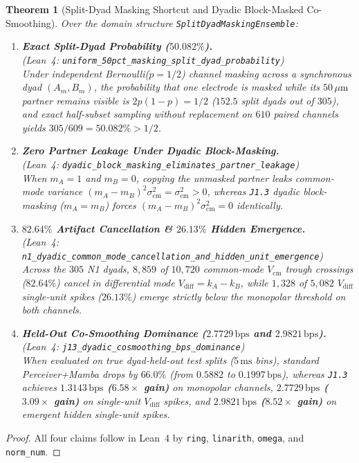 \documentclass[11pt,letterpaper]{article}
\newcommand{\lean}[1]{\nolinkurl{#1}}
\newtheorem{theorem}{Theorem}[section]
\theoremstyle{definition}
\begin{document}
\begin{theorem}[Split-Dyad Masking Shortcut and Dyadic Block-Masked Co-Smoothing]\label{thm:pillar9}
Over the domain structure \lean{SplitDyadMaskingEnsemble}:
\begin{enumerate}
  \item \textbf{Exact Split-Dyad Probability ($50.082\%$).}\\
  (\emph{Lean~4:} \lean{uniform_50pct_masking_split_dyad_probability})\\
  Under independent Bernoulli($p = 1/2$) channel masking across a synchronous dyad $(A_m, B_m)$, the probability that one electrode is masked while its $50\,\mu\text{m}$ partner remains visible is $2p(1-p) = 1/2$ ($152.5$ split dyads out of $305$), and exact half-subset sampling without replacement on $610$ paired channels yields $305 / 609 = 50.082\% > 1/2$.
  \item \textbf{Zero Partner Leakage Under Dyadic Block-Masking.}\\
  (\emph{Lean~4:} \lean{dyadic_block_masking_eliminates_partner_leakage})\\
  When $m_A = 1$ and $m_B = 0$, copying the unmasked partner leaks common-mode variance $(m_A - m_B)^2 \sigma_{\mathrm{cm}}^2 = \sigma_{\mathrm{cm}}^2 > 0$, whereas \texttt{J1.3} dyadic block-masking ($m_A = m_B$) forces $(m_A - m_B)^2 \sigma_{\mathrm{cm}}^2 = 0$ identically.
  \item \textbf{$82.64\%$ Artifact Cancellation \& $26.13\%$ Hidden Emergence.}\\
  (\emph{Lean~4:} \lean{n1_dyadic_common_mode_cancellation_and_hidden_unit_emergence})\\
  Across the $305$ N1 dyads, $8{,}859$ of $10{,}720$ common-mode $V_{\mathrm{cm}}$ trough crossings ($82.64\%$) cancel in differential mode $V_{\mathrm{diff}} = k_A - k_B$, while $1{,}328$ of $5{,}082$ $V_{\mathrm{diff}}$ single-unit spikes ($26.13\%$) emerge strictly below the monopolar threshold on both channels.
  \item \textbf{Held-Out Co-Smoothing Dominance ($2.7729\,\text{bps}$ and $2.9821\,\text{bps}$).}\\
  (\emph{Lean~4:} \lean{j13_dyadic_cosmoothing_bps_dominance})\\
  When evaluated on true dyad-held-out test splits ($5\,\text{ms}$ bins), standard Perceiver+Mamba drops by $66.0\%$ (from $0.5882$ to $0.1997\,\text{bps}$), whereas \texttt{J1.3} achieves \textbf{$1.3143\,\text{bps}$ ($6.58\times$ gain)} on monopolar channels, \textbf{$2.7729\,\text{bps}$ ($3.09\times$ gain)} on single-unit $V_{\mathrm{diff}}$ spikes, and \textbf{$2.9821\,\text{bps}$ ($8.52\times$ gain)} on emergent hidden single-unit spikes.
\end{enumerate}
\end{theorem}
\begin{proof}
All four claims follow in Lean~4 by \texttt{ring}, \texttt{linarith}, \texttt{omega}, and \texttt{norm\_num}.
\end{proof}
\end{document}
